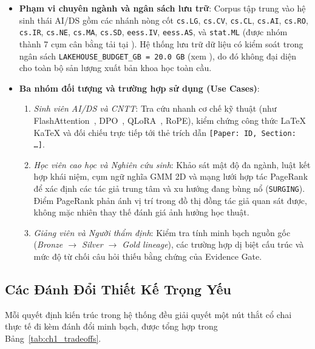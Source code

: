 \begin{itemize}
  \item \textbf{Phạm vi chuyên ngành và ngân sách lưu trữ}: Corpus tập trung vào hệ sinh thái AI/DS gồm các nhánh nòng cốt \texttt{cs.LG}, \texttt{cs.CV}, \texttt{cs.CL}, \texttt{cs.AI}, \texttt{cs.RO}, \texttt{cs.IR}, \texttt{cs.NE}, \texttt{cs.MA}, \texttt{cs.SD}, \texttt{eess.IV}, \texttt{eess.AS}, và \texttt{stat.ML} (được nhóm thành 7 cụm cân bằng tải tại ). Hệ thống lưu trữ dữ liệu có kiểm soát trong ngân sách \texttt{LAKEHOUSE\_BUDGET\_GB = 20.0 GB} (xem ), do đó không đại diện cho toàn bộ sản lượng xuất bản khoa học toàn cầu.
  \item \textbf{Ba nhóm đối tượng và trường hợp sử dụng (Use Cases)}:
    \begin{enumerate}[label=\textbf{\arabic*.}]
      \item \textit{Sinh viên AI/DS và CNTT}: Tra cứu nhanh cơ chế kỹ thuật (như FlashAttention~\cite{dao2022flashattention}, DPO~\cite{rafailov2023direct}, QLoRA~\cite{dettmers2024qlora}, RoPE), kiểm chứng công thức LaTeX KaTeX và đối chiếu trực tiếp tới thẻ trích dẫn \texttt{[Paper: ID, Section: \ldots]}.
      \item \textit{Học viên cao học và Nghiên cứu sinh}: Khảo sát mật độ đa ngành, luật kết hợp khái niệm, cụm ngữ nghĩa GMM 2D và mạng lưới hợp tác PageRank để xác định các tác giả trung tâm và xu hướng đang bùng nổ (\texttt{SURGING}). Điểm PageRank phản ánh vị trí trong đồ thị đồng tác giả quan sát được, không mặc nhiên thay thế đánh giá ảnh hưởng học thuật.
      \item \textit{Giảng viên và Người thẩm định}: Kiểm tra tính minh bạch nguồn gốc (\textit{Bronze $\rightarrow$ Silver $\rightarrow$ Gold lineage}), các trường hợp dị biệt cấu trúc và mức độ từ chối câu hỏi thiếu bằng chứng của Evidence Gate.
    \end{enumerate}
\end{itemize}

\subsection{Các Đánh Đổi Thiết Kế Trọng Yếu}
\label{sec:ch1_tradeoffs}

Mỗi quyết định kiến trúc trong hệ thống đều giải quyết một nút thắt cổ chai thực tế đi kèm đánh đổi minh bạch, được tổng hợp trong Bảng~\ref{tab:ch1_tradeoffs}.

